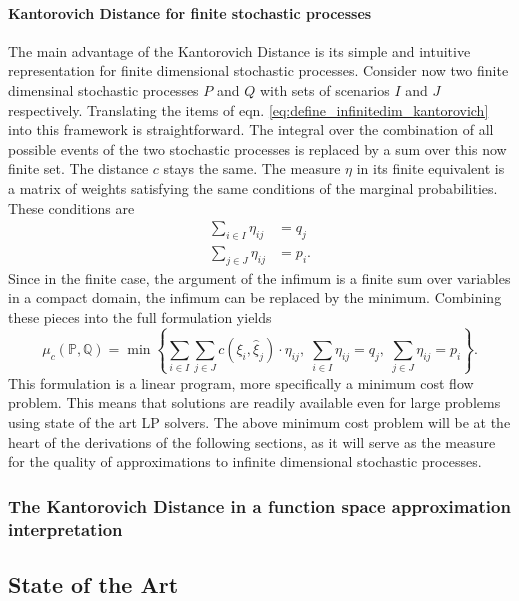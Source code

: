\documentclass[a4paper, 12pt] {article}
\begin{document}
\paragraph{Kantorovich Distance for finite stochastic processes} The main advantage of the Kantorovich Distance is its simple and intuitive representation for finite dimensional stochastic processes. Consider now two finite dimensinal stochastic processes $P$ and $Q$ with sets of scenarios $I$ and $J$ respectively. Translating the items of eqn. \ref{eq:define_infinitedim_kantorovich} into this framework is straightforward. The integral over the combination of all possible events of the two stochastic processes is replaced by a sum over this now finite set. The distance $c$ stays the same. The measure $\eta$ in its finite equivalent is a matrix of weights satisfying the same conditions of the marginal probabilities. These conditions are
\begin{align}
  \label{eq:finitedim-marginals-eta}
  \sum_{i\in I} \eta_{ij} &= q_j\\
  \sum_{j\in J} \eta_{ij} &= p_i.
\end{align}
Since in the finite case, the argument of the infimum is a finite sum over variables in a compact domain, the infimum can be replaced by the minimum. Combining these pieces into the full formulation yields
\begin{equation}
  \label{eq:define_finitedim_Kantorovich}
  \mu_c(\mathbb{P}, \mathbb{Q}) = \min\left\{\sum_{i\in I}\sum_{j\in J}c(\xi_i,\hat{\xi}_j)\cdot \eta_{ij},\; \sum_{i\in I}\eta_{ij}=q_j,\;\sum_{j\in J}\eta_{ij}=p_i\right\}.
\end{equation}
This formulation is a linear program, more specifically a minimum cost flow problem. This means that solutions are readily available even for large problems using state of the art LP solvers. The above minimum cost problem will be at the heart of the derivations of the following sections, as it will serve as the measure for the quality of approximations to infinite dimensional stochastic processes.
\subsubsection{The Kantorovich Distance in a function space approximation interpretation}
\subsection{State of the Art}
\end{document}
